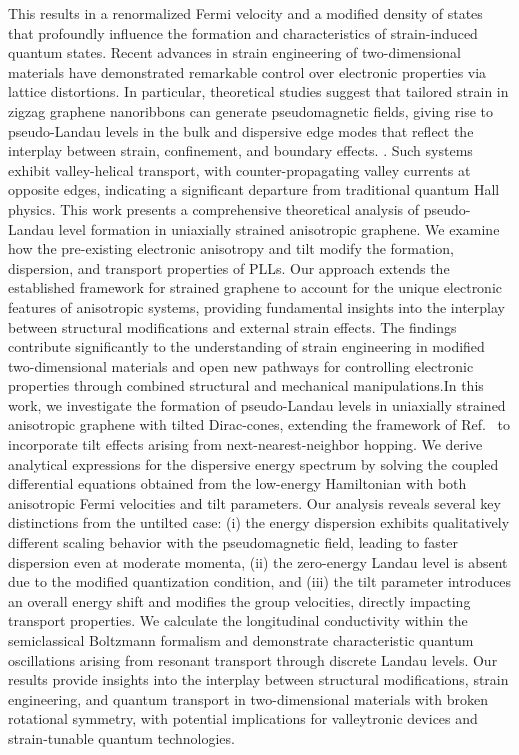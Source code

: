 \documentclass[aps,prb, onecolumn,nofootinbib,citeautoscript,10pt]{revtex4-2}
\begin{document}
This results in a renormalized Fermi velocity and a modified density of states that profoundly influence the formation and characteristics of strain-induced quantum states.
Recent advances in strain engineering of two-dimensional materials have demonstrated remarkable control over electronic properties via lattice distortions. In particular, theoretical studies suggest that tailored strain in zigzag graphene nanoribbons can generate pseudomagnetic fields, giving rise to pseudo-Landau levels in the bulk and dispersive edge modes that reflect the interplay between strain, confinement, and boundary effects. \cite{strained-dirac-franz}. Such systems exhibit valley-helical transport, with counter-propagating valley currents at opposite edges, indicating a significant departure from traditional quantum Hall physics.
This work presents a comprehensive theoretical analysis of pseudo-Landau level formation in uniaxially strained anisotropic graphene. We examine how the pre-existing electronic anisotropy and tilt modify the formation, dispersion, and transport properties of PLLs. Our approach extends the established framework for strained graphene to account for the unique electronic features of anisotropic systems, providing fundamental insights into the interplay between structural modifications and external strain effects. The findings contribute significantly to the understanding of strain engineering in modified two-dimensional materials and open new pathways for controlling electronic properties through combined structural and mechanical manipulations.In this work, we investigate the formation of pseudo-Landau levels in uniaxially strained anisotropic graphene with tilted Dirac-cones, extending the framework of Ref.~\cite{strained-dirac-franz} to incorporate tilt effects arising from next-nearest-neighbor hopping. We derive analytical expressions for the dispersive energy spectrum by solving the coupled differential equations obtained from the low-energy Hamiltonian with both anisotropic Fermi velocities and tilt parameters. Our analysis reveals several key distinctions from the untilted case: (i) the energy dispersion exhibits qualitatively different scaling behavior with the pseudomagnetic field, leading to faster dispersion even at moderate momenta, (ii) the zero-energy Landau level is absent due to the modified quantization condition, and (iii) the tilt parameter introduces an overall energy shift and modifies the group velocities, directly impacting transport properties. We calculate the longitudinal conductivity within the semiclassical Boltzmann formalism and demonstrate characteristic quantum oscillations arising from resonant transport through discrete Landau levels. Our results provide insights into the interplay between structural modifications, strain engineering, and quantum transport in two-dimensional materials with broken rotational symmetry, with potential implications for valleytronic devices and strain-tunable quantum technologies.
\end{document}
